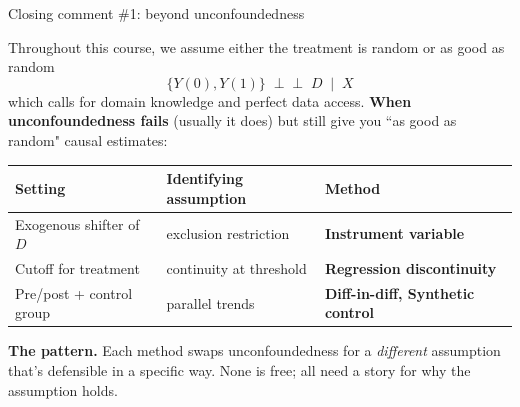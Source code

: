 \documentclass[aspectratio=169, 11pt, handout]{beamer}
\newcommand{\indep}{\perp\!\!\!\perp}
\begin{document}
 
\begin{frame}{Closing comment \#1: beyond unconfoundedness}

Throughout this course, we assume either the treatment is random or as good as random
\[
\{Y(0), Y(1)\} \;\indep\; D \;\mid\; X
\]
which calls for domain knowledge and perfect data access. \textbf{When unconfoundedness fails} (usually it does) but still give you ``as good as random" causal estimates:
 
\bigskip

\begin{tabular}{lll}
\toprule
\textbf{Setting} & \textbf{Identifying assumption} & \textbf{Method} \\
\midrule
Exogenous shifter of $D$ & exclusion restriction & \textbf{Instrument variable}\\
Cutoff for treatment     & continuity at threshold & \textbf{Regression discontinuity} \\
Pre/post + control group & parallel trends & \textbf{Diff-in-diff, Synthetic control}\\
\bottomrule
\end{tabular}

\bigskip

\textbf{The pattern.} Each method swaps unconfoundedness for a \emph{different} assumption that's defensible in a specific way. None is free; all need a story for why the assumption holds.
 
\end{frame}
 
\end{document}
